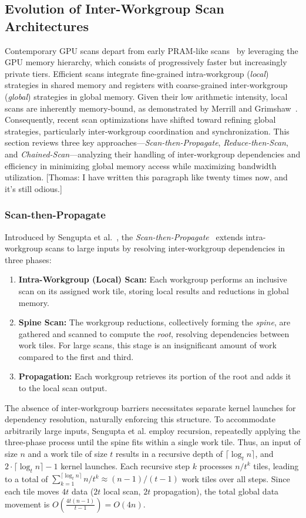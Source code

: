\documentclass[sigconf]{acmart}
\newcommand{\thomas}[1]{{\footnotesize\color{orange}[Thomas: #1]}}
\begin{document}
\subsection{Evolution of Inter-Workgroup Scan Architectures}
Contemporary GPU scans depart from early PRAM-like scans~\cite{} by leveraging the GPU memory hierarchy, which consists of progressively faster but increasingly private tiers. Efficient scans integrate fine-grained intra-workgroup (\emph{local}) strategies in shared memory and registers with coarse-grained inter-workgroup (\emph{global}) strategies in global memory. Given their low arithmetic intensity, local scans are inherently memory-bound, as demonstrated by Merrill and Grimshaw~\cite{}. Consequently, recent scan optimizations have shifted toward refining global strategies, particularly inter-workgroup coordination and synchronization. This section reviews three key approaches---\emph{Scan-then-Propagate}, \emph{Reduce-then-Scan}, and \emph{Chained-Scan}---analyzing their handling of inter-workgroup dependencies and efficiency in minimizing global memory access while maximizing bandwidth utilization. \thomas{I have written this paragraph like twenty times now, and it's still odious.}

\subsubsection{Scan-then-Propagate}
Introduced by Sengupta et al.~\cite{10.5555/1280094.1280110}, the \emph{Scan-then-Propagate}~\cite{GPUGems3, Sengupta2011} extends intra-workgroup scans to large inputs by resolving inter-workgroup dependencies in three phases:
\begin{enumerate}
  \item \textbf{Intra-Workgroup (Local) Scan:}  Each workgroup performs an inclusive scan on its assigned work tile, storing local results and reductions in global memory.
  \item \textbf{Spine Scan:} The workgroup reductions, collectively forming the \emph{spine}, are gathered and scanned to compute the \emph{root}, resolving dependencies between work tiles. For large scans, this stage is an insignificant amount of work compared to the first and third.
  \item \textbf{Propagation:} Each workgroup retrieves its portion of the root and adds it to the local scan output.
\end{enumerate}
The absence of inter-workgroup barriers necessitates separate kernel launches for dependency resolution, naturally enforcing this structure. To accommodate arbitrarily large inputs, Sengupta et al. employ recursion, repeatedly applying the three-phase process until the spine fits within a single work tile. Thus, an input of size $n$ and a work tile of size $t$ results in a recursive depth of $\lceil \log_t n \rceil$, and $2\cdot\lceil \log_t n \rceil - 1$ kernel launches. Each recursive step $k$ processes $n/t^k$ tiles, leading to a total of $\sum_{k=1}^{\lceil \log_t n \rceil} n/t^k \approx (n - 1)/(t - 1)$ work tiles over all steps. Since each tile moves $4t$ data ($2t$ local scan, $2t$ propagation), the total global data movement is $O\left(\frac{4t(n - 1)}{t - 1}\right) = O(4n)$.
\end{document}
